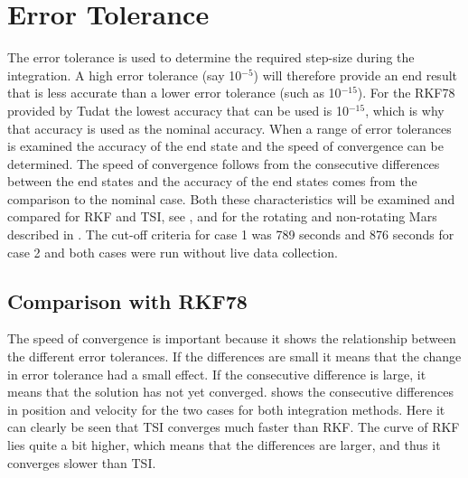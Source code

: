 \section{Error Tolerance}
\label{sec:errorTolerance}
The error tolerance is used to determine the required step-size during the integration. A high error tolerance (say 10$^{-5}$) will therefore provide an end result that is less accurate than a lower error tolerance (such as 10$^{-15}$). For the \ac{RKF78} provided by \ac{Tudat} the lowest accuracy that can be used is 10$^{-15}$, which is why that accuracy is used as the nominal accuracy. When a range of error tolerances is examined the accuracy of the end state and the speed of convergence can be determined. The speed of convergence follows from the consecutive differences between the end states and the accuracy of the end states comes from the comparison to the nominal case. Both these characteristics will be examined and compared for \ac{RKF} and \ac{TSI}, see , and for the rotating and non-rotating Mars described in . The cut-off criteria for case 1 was 789 seconds and 876 seconds for case 2 and both cases were run without live data collection.




\subsection{Comparison with \ac{RKF78}}
\label{subsec:errorToleranceCompRKF}
The speed of convergence is important because it shows the relationship between the different error tolerances. If the differences are small it means that the change in error tolerance had a small effect. If the consecutive difference is large, it means that the solution has not yet converged.  shows the consecutive differences in position and velocity for the two cases for both integration methods. Here it can clearly be seen that \ac{TSI} converges much faster than \ac{RKF}. The curve of \ac{RKF} lies quite a bit higher, which means that the differences are larger, and thus it converges slower than \ac{TSI}.




%

